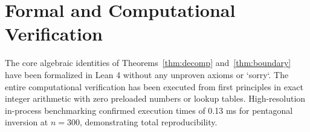 \documentclass[11pt,reqno]{amsart}
\theoremstyle{definition}
\numberwithin{equation}{section}
\begin{document}
\section{Formal and Computational Verification}

The core algebraic identities of Theorems~\ref{thm:decomp} and~\ref{thm:boundary} have been formalized in Lean 4 without any unproven axioms or `sorry`.
The entire computational verification has been executed from first principles in exact integer arithmetic with zero preloaded numbers or lookup tables. High-resolution in-process benchmarking confirmed execution times of 0.13 ms for pentagonal inversion at $n = 300$, demonstrating total reproducibility.



\end{document}
